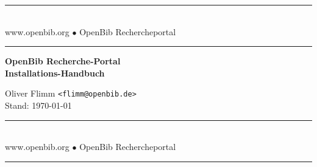 \documentclass[11pt, twoside, a4paper, BCOR8mm, DIV12, bibtotoc,idxtotoc]{scrbook}
\begin{document}
\frontmatter

\begin{titlepage}

\begin{center}
\rule[-.1in]{16cm}{1mm}\\[3mm]
{\fontsize{20}{20pt}\selectfont
  www.openbib.org $\bullet$ OpenBib Rechercheportal}\\[-2mm]
\rule[-.1in]{16cm}{1mm}

\vspace{5cm}

  \textbf{\fontsize{30}{30pt}\selectfont OpenBib Recherche-Portal\\[3mm] Installations-Handbuch}

  \vspace{2cm}

  Oliver Flimm \texttt{<flimm@openbib.de>}\\
  Stand: \today

  \vspace{8cm}

\rule[-.1in]{16cm}{1mm}\\[3mm]
{\fontsize{20}{20pt}\selectfont
  www.openbib.org $\bullet$ OpenBib Rechercheportal}\\[-2mm]
\rule[-.1in]{16cm}{1mm}

\end{center}

\end{titlepage}






\tableofcontents
\end{document}
